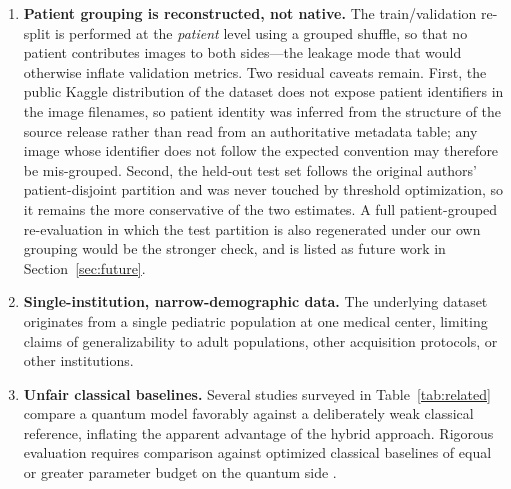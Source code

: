 \documentclass[11pt,a4paper]{article}
\begin{document}
\begin{enumerate}[leftmargin=1.4em]
    uses a single train/validation/test split without cross-validation or
    repeated randomized resampling, owing to the computational cost of circuit
    simulation.  We mitigate this with an exact McNemar test ($p = 0.71$) and
    non-parametric bootstrap confidence intervals ($B = 1000$), the latter
    yielding overlapping $95\%$ intervals for test AUC-ROC
    (Section~\ref{sec:hybrid}).  A paired design with repeated splits would
    nonetheless be required to separate the observed 0.64-percentage-point
    accuracy difference from run-to-run variance, and we make no claim that
    the difference is meaningful in either direction.  Relatedly, the
    hyperparameter search that fixed the 64-dimensional latent size and the
    three-layer depth was conducted on the validation set of this same split,
    so the reported validation-selected quantities are mildly optimistic as
    estimates of generalization.
  \item \textbf{Patient grouping is reconstructed, not native.}  The
    train/validation re-split is performed at the \emph{patient} level using a
    grouped shuffle, so that no patient contributes images to both sides---the
    leakage mode that would otherwise inflate validation metrics.  Two
    residual caveats remain.  First, the public Kaggle distribution of the
    dataset does not expose patient identifiers in the image filenames, so
    patient identity was inferred from the structure of the source release
    rather than read from an authoritative metadata table; any image whose
    identifier does not follow the expected convention may therefore be
    mis-grouped.  Second, the held-out test set follows the original authors'
    patient-disjoint partition and was never touched by threshold
    optimization, so it remains the more conservative of the two estimates.  A
    full patient-grouped re-evaluation in which the test partition is also
    regenerated under our own grouping would be the stronger check, and is
    listed as future work in Section~\ref{sec:future}.
  \item \textbf{Single-institution, narrow-demographic data.}  The underlying
    dataset originates from a single pediatric population at one medical center,
    limiting claims of generalizability to adult populations, other acquisition
    protocols, or other institutions.
  \item \textbf{Unfair classical baselines.}  Several studies surveyed in
    Table~\ref{tab:related} compare a quantum model favorably against a
    deliberately weak classical reference, inflating the apparent advantage of
    the hybrid approach.  Rigorous evaluation requires comparison against
    optimized classical baselines of equal or greater parameter budget on the
    quantum side \cite{aaronson2015}.
\end{enumerate}
\end{document}
